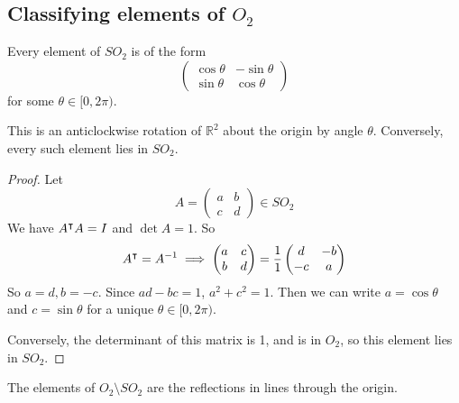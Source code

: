 \subsection{Classifying elements of \(O_2\)}
\begin{theorem}
	Every element of \(SO_2\) is of the form
	\[
		\begin{pmatrix}
			\cos\theta & -\sin\theta \\
			\sin\theta & \cos\theta
		\end{pmatrix}
	\]
	for some \(\theta \in [0, 2\pi)\).

	This is an anticlockwise rotation of \(\mathbb R^2\) about the origin by angle \(\theta\).
	Conversely, every such element lies in \(SO_2\).
\end{theorem}
\begin{proof}
	Let
	\[
		A = \begin{pmatrix}
			a & b \\ c & d
		\end{pmatrix} \in SO_2
	\]
	We have \(A^\intercal A = I\) and \(\det A = 1\).
	So
	\[
		A^\intercal = A^{-1} \implies \begin{pmatrix}
			a & c \\ b & d
		\end{pmatrix} = \frac{1}{1} \begin{pmatrix}
			d & -b \\ -c & a
		\end{pmatrix}
	\]
	So \(a=d, b=-c\).
	Since \(ad-bc=1\), \(a^2+c^2=1\).
	Then we can write \(a = \cos \theta\) and \(c = \sin \theta\) for a unique \(\theta \in [0, 2\pi)\).

	Conversely, the determinant of this matrix is 1, and is in \(O_2\), so this element lies in \(SO_2\).
\end{proof}
\begin{theorem}
	The elements of \(O_2 \setminus SO_2\) are the reflections in lines through the origin.
\end{theorem}
